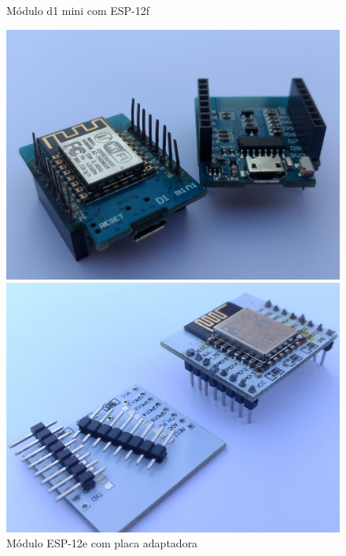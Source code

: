 \begin{figure}[htb]
	\centering
	\begin{minipage}{0.49\textwidth}
		\centering
		\caption{Módulo d1 mini com ESP-12f \label{fig:d1-mini}}
		\includegraphics[width=1\textwidth]{041-esp8266/img/d1-mini.jpg}
	\end{minipage}
	\hfill
	\begin{minipage}{0.49\textwidth}
		\centering
		\caption{Módulo ESP-12e com placa adaptadora \label{fig:esp-12e-placa}}
		\includegraphics[width=1\textwidth]{041-esp8266/img/esp-12e-placa.jpg}
	\end{minipage}
\end{figure}

